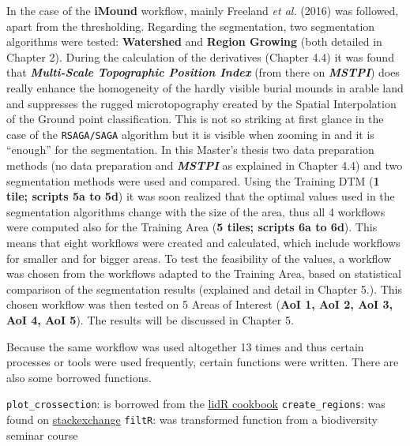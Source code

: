 \documentclass[
  12pt,
]{article}
\begin{document}
In the case of the \textbf{iMound} workflow, mainly Freeland \emph{et al.} (2016) was followed, apart from the thresholding. Regarding the segmentation, two segmentation algorithms were tested: \textbf{Watershed} and \textbf{Region Growing} (both detailed in Chapter 2). During the calculation of the derivatives (Chapter 4.4) it was found that \textbf{\emph{Multi-Scale Topographic Position Index}} (from there on \textbf{\emph{MSTPI}}) does really enhance the homogeneity of the hardly visible burial mounds in arable land and suppresses the rugged microtopography created by the Spatial Interpolation of the Ground point classification. This is not so striking at first glance in the case of the \texttt{RSAGA/SAGA} algorithm but it is visible when zooming in and it is ``enough'' for the segmentation.
In this Master's thesis two data preparation methods (no data preparation and \textbf{\emph{MSTPI}} as explained in Chapter 4.4) and two segmentation methods were used and compared. Using the Training DTM (\textbf{1 tile; scripts 5a to 5d}) it was soon realized that the optimal values used in the segmentation algorithms change with the size of the area, thus all 4 workflows were computed also for the Training Area (\textbf{5 tiles; scripts 6a to 6d}). This means that eight workflows were created and calculated, which include workflows for smaller and for bigger areas. To test the feasibility of the values, a workflow was chosen from the workflows adapted to the Training Area, based on statistical comparison of the segmentation results (explained and detail in Chapter 5.). This chosen workflow was then tested on 5 Areas of Interest (\textbf{AoI 1, AoI 2, AoI 3, AoI 4, AoI 5}). The results will be discussed in Chapter 5.

Because the same workflow was used altogether 13 times and thus certain processes or tools were used frequently, certain functions were written. There are also some borrowed functions.

\texttt{plot\_crossection}: is borrowed from the \href{https://jean-romain.github.io/lidRbook/io.html\#plot}{lidR cookbook}
\newline
\texttt{create\_regions}: was found on \href{https://gis.stackexchange.com/questions/79114/joining-nearest-neighbor-small-polygons-using-r}{stackexchange}
\newline
\texttt{filtR}: was transformed function from a biodiversity seminar course
\end{document}
